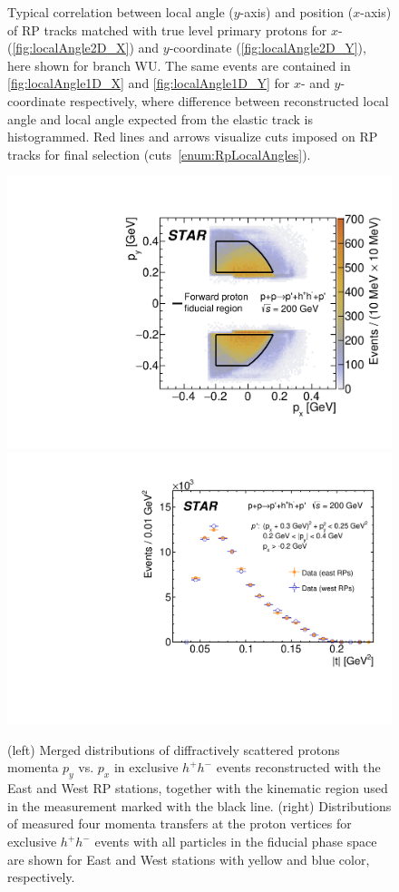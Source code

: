 \begin{figure}[h]
{}%
\label{fig:localAngleRp}%
\caption[Local angle vs. position of RP tracks matched with true level primary protons.]{Typical correlation between local angle ($y$-axis) and position ($x$-axis) of RP tracks matched with true level primary protons for $x$- (\ref{fig:localAngle2D_X}) and $y$-coordinate (\ref{fig:localAngle2D_Y}), here shown for branch WU. The same events are contained in \ref{fig:localAngle1D_X} and \ref{fig:localAngle1D_Y} for $x$- and $y$-coordinate respectively, where difference between reconstructed local angle and local angle expected from the elastic track is histogrammed. Red lines and arrows visualize cuts imposed on RP tracks for final selection (cuts~\ref{enum:RpLocalAngles}).}
\end{figure}






\begin{figure}[h]
\centering
\includegraphics[width=.465\textwidth]{graphics/eventSelection/RpTracks/PxPyExclusiveAllMerged.pdf}
\includegraphics[width=.523\textwidth]{graphics/eventSelection/RpTracks/Paper_MandelstamT.pdf}
%
\caption{(left) Merged distributions of diffractively scattered protons momenta $p_y$ vs. $p_x$ in exclusive $h^{+}h^{-}$ events reconstructed with the East and West RP stations, together with the kinematic region used in the measurement marked with the black line. (right) Distributions of measured four momenta transfers at the proton vertices for exclusive $h^{+}h^{-}$ events with all particles in the fiducial phase space are shown for East and West stations with yellow and blue color, respectively.}
\label{fig:rp_hits}
\end{figure}





